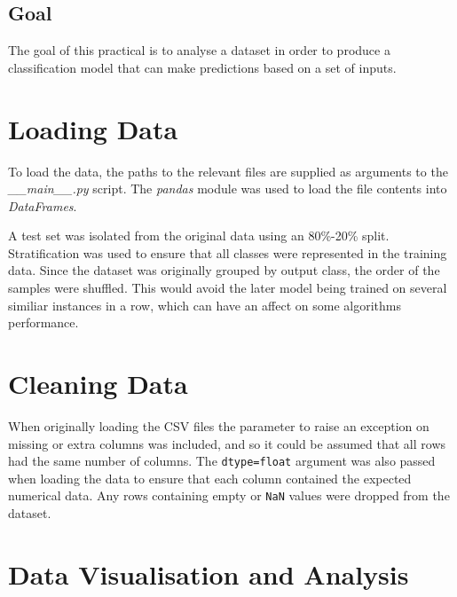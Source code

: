 \documentclass[12pt]{article}
\begin{document}
\begin{titlepage}

\vfill %

\end{titlepage}

\subsection*{Goal}

The goal of this practical is to analyse a dataset in order to produce a classification model that can make predictions based on a set of inputs.

\tableofcontents

\pagebreak
{}
\setcounter{page}{1} 

\section{Loading Data}

To load the data, the paths to the relevant files are supplied as arguments to the \emph{\_\_main\_\_.py} script. The \emph{pandas} module was used to load the file contents into \emph{DataFrames}.

A test set was isolated from the original data using an 80\%-20\% split. Stratification was used to ensure that all classes were represented in the training data. Since the dataset was originally grouped by output class, the order of the samples were shuffled. This would avoid the later model being trained on several similiar instances in a row, which can have an affect on some algorithms performance.

\section{Cleaning Data}

When originally loading the CSV files the parameter to raise an exception on missing or extra columns was included, and so it could be assumed that all rows had the same number of columns. The \lstinline{dtype=float} argument was also passed when loading the data to ensure that each column contained the expected numerical data. Any rows containing empty or \lstinline{NaN} values were dropped from the dataset.

\section{Data Visualisation and Analysis}
\end{document}
